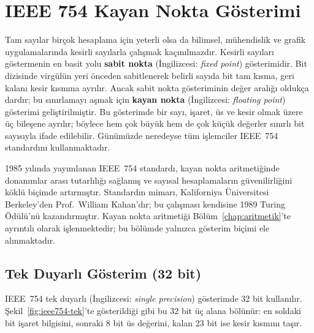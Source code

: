 \section{IEEE 754 Kayan Nokta Gösterimi}
\label{sec:ekA-ieee754}

Tam sayılar birçok hesaplama için yeterli olsa da bilimsel, mühendislik ve grafik uygulamalarında kesirli sayılarla çalışmak kaçınılmazdır. Kesirli sayıları göstermenin en basit yolu \textbf{sabit nokta} (İngilizcesi: \textit{fixed point}) gösterimidir. Bit dizisinde virgülün yeri önceden sabitlenerek belirli sayıda bit tam kısma, geri kalanı kesir kısmına ayrılır. Ancak sabit nokta gösteriminin değer aralığı oldukça dardır; bu sınırlamayı aşmak için \textbf{kayan nokta} (İngilizcesi: \textit{floating point}) gösterimi geliştirilmiştir. Bu gösterimde bir sayı, işaret, üs ve kesir olmak üzere üç bileşene ayrılır; böylece hem çok büyük hem de çok küçük değerler sınırlı bit sayısıyla ifade edilebilir. Günümüzde neredeyse tüm işlemciler IEEE~754 standardını kullanmaktadır.

\begin{bilginot}
1985 yılında yayımlanan IEEE~754 standardı, kayan nokta aritmetiğinde donanımlar arası tutarlılığı sağlamış ve sayısal hesaplamaların güvenilirliğini köklü biçimde artırmıştır. Standardın mimarı, Kaliforniya Üniversitesi Berkeley'den Prof.~William Kahan'dır; bu çalışması kendisine 1989 Turing Ödülü'nü kazandırmıştır. Kayan nokta aritmetiği Bölüm~\ref{chap:aritmetik}'te ayrıntılı olarak işlenmektedir; bu bölümde yalnızca gösterim biçimi ele alınmaktadır.
\end{bilginot}

\subsection{Tek Duyarlı Gösterim (32 bit)}
\label{sec:ekA-ieee754-tek}

IEEE~754 tek duyarlı (İngilizcesi: \textit{single precision}) gösterimde 32 bit kullanılır. Şekil~\ref{fig:ieee754-tek}'te gösterildiği gibi bu 32 bit üç alana bölünür: en soldaki bit işaret bilgisini, sonraki 8 bit üs değerini, kalan 23 bit ise kesir kısmını taşır.

